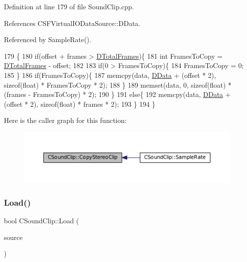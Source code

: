 Definition at line 179 of file Sound\+Clip.\+cpp.



References C\+S\+F\+Virtual\+I\+O\+Data\+Source\+::\+D\+Data.



Referenced by Sample\+Rate().


\begin{DoxyCode}
179                                                                   \{
180     \textcolor{keywordflow}{if}(offset + frames > \hyperlink{classCSoundClip_ab0d9eb261d09fa2a106658276f37285b}{DTotalFrames})\{
181         \textcolor{keywordtype}{int} FramesToCopy = \hyperlink{classCSoundClip_ab0d9eb261d09fa2a106658276f37285b}{DTotalFrames} - offset;
182         
183         \textcolor{keywordflow}{if}(0 > FramesToCopy)\{
184             FramesToCopy = 0;
185         \}
186         \textcolor{keywordflow}{if}(FramesToCopy)\{
187             memcpy(data, \hyperlink{classCSoundClip_a220921a0c81e5c63e2cd3c55c75878b1}{DData} + (offset * 2), \textcolor{keyword}{sizeof}(\textcolor{keywordtype}{float}) * FramesToCopy * 2);
188         \}
189         memset(data, 0, \textcolor{keyword}{sizeof}(\textcolor{keywordtype}{float}) * (frames - FramesToCopy) * 2);
190     \}
191     \textcolor{keywordflow}{else}\{
192         memcpy(data, \hyperlink{classCSoundClip_a220921a0c81e5c63e2cd3c55c75878b1}{DData} + (offset * 2), \textcolor{keyword}{sizeof}(\textcolor{keywordtype}{float}) * frames * 2);
193     \}
194 \}
\end{DoxyCode}
Here is the caller graph for this function\+:\nopagebreak
\begin{figure}[H]
\begin{center}
\leavevmode
\includegraphics[width=350pt]{classCSoundClip_a9cc8dd683c638331b2d0532aa68149da_icgraph}
\end{center}
\end{figure}
\hypertarget{classCSoundClip_a4b8a88d0062844969cbe1ab763c3590a}{}\label{classCSoundClip_a4b8a88d0062844969cbe1ab763c3590a} 
\subsubsection{\texorpdfstring{Load()}{Load()}}
{\footnotesize\ttfamily bool C\+Sound\+Clip\+::\+Load (\begin{DoxyParamCaption}\item[{std\+::shared\+\_\+ptr$<$ \hyperlink{classCDataSource}{C\+Data\+Source} $>$}]{source }\end{DoxyParamCaption})}



